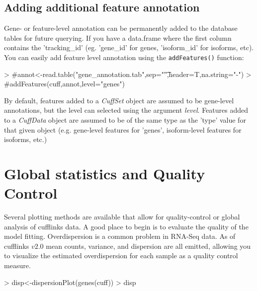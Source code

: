 \documentclass[10pt]{article}
\newcommand{\Rfunction}[1]{\texttt{#1}}
\newcommand{\Rclass}[1]{{\textit{#1}}}
\newcommand{\Rfunarg}[1]{{\textit{#1}}}
\begin{document}
\subsection{Adding additional feature annotation}
Gene- or feature-level annotation can be permanently added to the database tables for future querying. If you have a data.frame where the first column contains the 'tracking\_id' (eg. 'gene\_id' for genes, 'isoform\_id' for isoforms, etc). You can easily add feature level annotation using the \Rfunction{addFeatures()} function:

\begin{Schunk}
\begin{Sinput}
> #annot<-read.table("gene_annotation.tab",sep="\t",header=T,na.string="-")
> #addFeatures(cuff,annot,level="genes")
\end{Sinput}
\end{Schunk}
By default, features added to a \Rclass{CuffSet} object are assumed to be gene-level annotations, but the level can selected using the argument \Rfunarg{level}. Features added to a \Rclass{CuffData} object are assumed to be of the same type as the 'type' value for that given object (e.g. gene-level features for 'genes', isoform-level features for isoforms, etc.)

\clearpage

\section{Global statistics and Quality Control}
Several plotting methods are available that allow for quality-control or global analysis of cufflinks data. A good place to begin is to evaluate the quality of the model fitting. Overdispersion is a common problem in RNA-Seq data. As of cufflinks $v2.0$ mean counts, variance, and dispersion are all emitted,
allowing you to visualize the estimated overdispersion for each sample as a quality control measure.

\begin{Schunk}
\begin{Sinput}
> disp<-dispersionPlot(genes(cuff))
> disp
\end{Sinput}
\end{Schunk}

\begin{figure}[htp]
	\begin{center}
	
	\end{center}
\end{figure}
\end{document}
